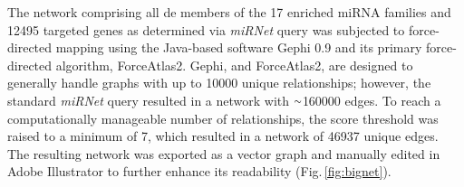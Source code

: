 \begin{method}

The network comprising all \ac{de} members of the 17 enriched miRNA families and \num{12495} targeted genes as determined via \textit{miRNet} query was subjected to force-directed mapping using the Java-based software Gephi 0.9 and its primary force-directed algorithm, ForceAtlas2\cite{Jacomy2014}. Gephi, and ForceAtlas2, are designed to generally handle graphs with up to \num{10000} unique relationships; however, the standard \textit{miRNet} query resulted in a network with $\smallsim$\num{160000} edges. To reach a computationally manageable number of relationships, the score threshold was raised to a minimum of 7, which resulted in a network of \num{46937} unique edges. The resulting network was exported as a vector graph and manually edited in Adobe Illustrator to further enhance its readability (Fig.\,\ref{fig:bignet}).

\end{method}

